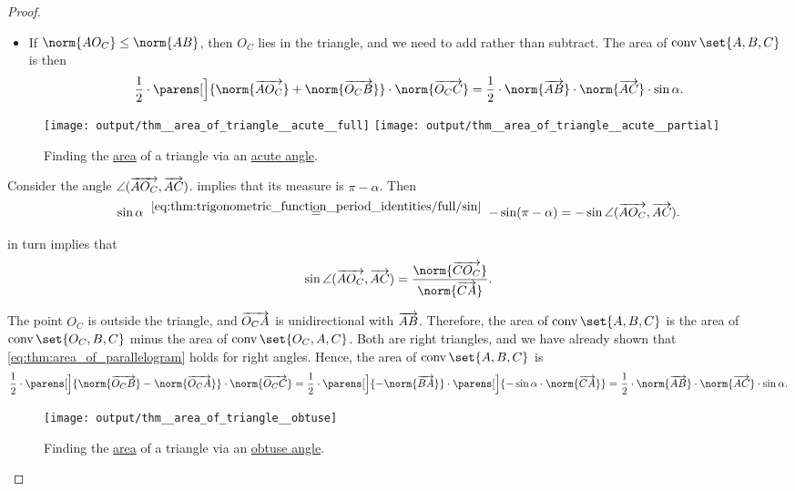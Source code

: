 \begin{proof}
\begin{itemize}
    \item If \( \norm{A O_C} \leq \norm{A B} \), then \( O_C \) lies in the triangle, and we need to add rather than subtract. The area of \( \conv\set{ A, B, C } \) is then
    \begin{equation*}
      \frac 1 2 \cdot \parens[\Big]{ \norm{\vect{A O_C}} + \norm{\vect{O_C B}} } \cdot \norm{\vect{O_C C}} = \frac 1 2 \cdot \norm{\vect{AB}} \cdot \norm{\vect{AC}} \cdot \sin \alpha.
    \end{equation*}
  \end{itemize}

  \begin{figure}[!ht]
    \hfill
    \hfill
    \texttt{[image: output/thm\_\_area\_of\_triangle\_\_acute\_\_full]}
    \hfill
    \texttt{[image: output/thm\_\_area\_of\_triangle\_\_acute\_\_partial]}
    \hfill
    \caption{Finding the \hyperref[def:figure_area]{area} of a triangle via an \hyperref[def:angle/measure/acute]{acute angle}.}\label{fig:thm:area_of_triangle/measure/acute}
  \end{figure}

   Consider the angle \( \angle(\overrightarrow{A O_C}, \overrightarrow{A C}) \).  implies that its measure is \( \pi - \alpha \). Then
  \begin{equation*}
    \sin \alpha
    \reloset {\eqref{eq:thm:trigonometric_function_period_identities/full/sin}} =
    -\sin(\pi - \alpha)
    =
    -\sin \angle(\vect{A O_C}, \vect{A C}).
  \end{equation*}

   in turn implies that
  \begin{equation*}
    \sin \angle(\vect{A O_C}, \vect{A C})
    =
    \frac {\norm{\vect{C O_C}}} {\norm{\vect{CA}}}.
  \end{equation*}

  The point \( O_C \) is outside the triangle, and \( \overrightarrow{O_C A} \) is unidirectional with \( \overrightarrow{AB} \). Therefore, the area of \( \conv\set{ A, B, C } \) is the area of \( \conv\set{ O_C, B, C } \) minus the area of \( \conv\set{ O_C, A, C } \). Both are right triangles, and we have already shown that \eqref{eq:thm:area_of_parallelogram} holds for right angles. Hence, the area of \( \conv\set{ A, B, C } \) is
  \begin{equation*}
    \frac 1 2 \cdot \parens[\Big]{ \norm{\vect{O_C B}} - \norm{\vect{O_C A}} } \cdot \norm{\vect{O_C C}}
    =
    \frac 1 2 \cdot \parens[\Big]{ -\norm{\vect{B A}} } \cdot \parens[\Big]{ -\sin \alpha \cdot \norm{\vect{CA}} }
    =
    \frac 1 2 \cdot \norm{\vect{AB}} \cdot \norm{\vect{AC}} \cdot \sin \alpha.
  \end{equation*}

  \begin{figure}[!ht]
    \centering
    \texttt{[image: output/thm\_\_area\_of\_triangle\_\_obtuse]}
    \caption{Finding the \hyperref[def:figure_area]{area} of a triangle via an \hyperref[def:angle/measure/obtuse]{obtuse angle}.}\label{fig:thm:area_of_triangle/measure/obtuse}
  \end{figure}
\end{proof}

